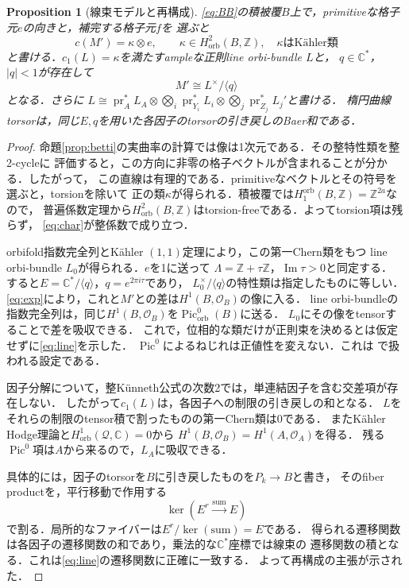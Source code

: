 \documentclass[12pt]{amsart}
\newtheorem{prop}[thm]{Proposition}
\theoremstyle{definition}
\theoremstyle{remark}
\numberwithin{equation}{section}
\newcommand{\cO}{\mathcal{O}}
\DeclareMathOperator{\pr}{pr}
\newcommand{\orb}{\mathrm{orb}}
\newcommand{\Z}{\mathbb{Z}}
\newcommand{\C}{\mathbb{C}}
\newcommand{\Pic}{\operatorname{Pic}}
\newcommand{\Qfac}{\mathcal{Q}}
\begin{document}
\begin{prop}[線束モデルと再構成]\label{prop:reconstruct}
\eqref{eq:BB}の積被覆$B$上で，primitiveな格子元$e$の向きと，補完する格子元$f$を
選ぶと
\begin{equation}\label{eq:char}
c(M')=\kappa\otimes e,
\qquad \kappa\in H^2_{\orb}(B,\Z),\quad \kappa\text{はK\"ahler類}
\end{equation}
と書ける．$c_1(L)=\kappa$を満たすampleな正則line orbi-bundle $L$と，
$q\in\C^*$，$|q|<1$が存在して
\begin{equation}\label{eq:line}
M'\cong L^{\times}/\langle q\rangle
\end{equation}
となる．さらに
$L\cong\pr_A^*L_A\otimes\bigotimes_i\pr_{Y_i}^*L_i
\otimes\bigotimes_j\pr_{Z_j}^*L_j'$と書ける．
楕円曲線torsorは，同じ$E,q$を用いた各因子のtorsorの引き戻しのBaer和である．
\end{prop}
\begin{proof}
命題\ref{prop:betti}の実曲率の計算では像は1次元である．その整特性類を整2-cycleに
評価すると，この方向に非零の格子ベクトルが含まれることが分かる．したがって，
この直線は有理的である．primitiveなベクトルとその符号を選ぶと，torsionを除いて
正の類$\kappa$が得られる．積被覆では$H_1^{\orb}(B,\Z)=\Z^{2a}$なので，
普遍係数定理から$H^2_{\orb}(B,\Z)$はtorsion-freeである．よってtorsion項は残らず，
\eqref{eq:char}が整係数で成り立つ．

orbifold指数完全列とK\"ahler $(1,1)$定理により，この第一Chern類をもつ
line orbi-bundle $L_0$が得られる．$e$を1に送って
$\Lambda=\Z+\tau\Z$，$\operatorname{Im}\tau>0$と同定する．
すると$E=\C^*/\langle q\rangle$，$q=e^{2\pi i\tau}$であり，
$L_0^{\times}/\langle q\rangle$の特性類は指定したものに等しい．
\eqref{eq:exp}により，これと$M'$との差は$H^1(B,\cO_B)$の像に入る．
line orbi-bundleの指数完全列は，同じ$H^1(B,\cO_B)$を$\Pic^0_{\orb}(B)$に送る．
$L_0$にその像をtensorすることで差を吸収できる．
これで，位相的な類だけが正則束を決めるとは仮定せずに\eqref{eq:line}を示した．
$\Pic^0$によるねじれは正値性を変えない．これは
\cite[Theorem 2.4]{Istrati}で扱われる設定である．

因子分解について，整K\"unneth公式の次数2では，単連結因子を含む交差項が存在しない．
したがって$c_1(L)$は，各因子への制限の引き戻しの和となる．
$L$をそれらの制限のtensor積で割ったものの第一Chern類は0である．
またK\"ahler Hodge理論と$H^1_{\orb}(\Qfac,\C)=0$から
$H^1(B,\cO_B)=H^1(A,\cO_A)$を得る．
残る$\Pic^0$項は$A$から来るので，$L_A$に吸収できる．

具体的には，因子のtorsorを$B$に引き戻したものを$P_k\to B$と書き，
そのfiber productを，平行移動で作用する
\[
\ker(E^r\xrightarrow{\mathrm{sum}}E)
\]
で割る．局所的なファイバーは$E^r/\ker(\mathrm{sum})=E$である．
得られる遷移関数は各因子の遷移関数の和であり，乗法的な$\C^*$座標では線束の
遷移関数の積となる．これは\eqref{eq:line}の遷移関数に正確に一致する．
よって再構成の主張が示された．
\end{proof}
\end{document}
